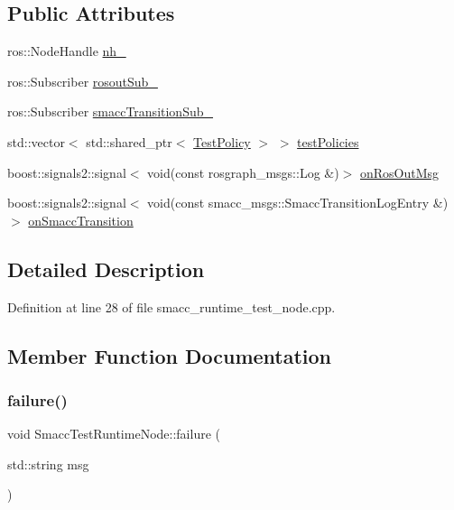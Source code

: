 \subsection*{Public Attributes}
\begin{DoxyCompactItemize}
\item 
ros\+::\+Node\+Handle \hyperlink{classSmaccTestRuntimeNode_a7521807a7f051ca753672ee459f93d4a}{nh\+\_\+}
\item 
ros\+::\+Subscriber \hyperlink{classSmaccTestRuntimeNode_a88121fc45189308d50f49c950461e1f8}{rosout\+Sub\+\_\+}
\item 
ros\+::\+Subscriber \hyperlink{classSmaccTestRuntimeNode_a8cd8b97668759afd45898951011487d0}{smacc\+Transition\+Sub\+\_\+}
\item 
std\+::vector$<$ std\+::shared\+\_\+ptr$<$ \hyperlink{classTestPolicy}{Test\+Policy} $>$ $>$ \hyperlink{classSmaccTestRuntimeNode_a099952c0249a6f4f94469d991a644b69}{test\+Policies}
\item 
boost\+::signals2\+::signal$<$ void(const rosgraph\+\_\+msgs\+::\+Log \&)$>$ \hyperlink{classSmaccTestRuntimeNode_a9b544f3ca3684171cbb56d97aadeac17}{on\+Ros\+Out\+Msg}
\item 
boost\+::signals2\+::signal$<$ void(const smacc\+\_\+msgs\+::\+Smacc\+Transition\+Log\+Entry \&)$>$ \hyperlink{classSmaccTestRuntimeNode_aaaedcb5c8a4cca432b5138bb1dfb0a6c}{on\+Smacc\+Transition}
\end{DoxyCompactItemize}


\subsection{Detailed Description}


Definition at line 28 of file smacc\+\_\+runtime\+\_\+test\+\_\+node.\+cpp.



\subsection{Member Function Documentation}
\mbox{\label{classSmaccTestRuntimeNode_a58254eca6e6a5f2bde6417a1cccc932a}} 
\subsubsection{\texorpdfstring{failure()}{failure()}}
{\footnotesize\ttfamily void Smacc\+Test\+Runtime\+Node\+::failure (\begin{DoxyParamCaption}\item[{std\+::string}]{msg }\end{DoxyParamCaption})\hspace{0.3cm}{\ttfamily [inline]}}



